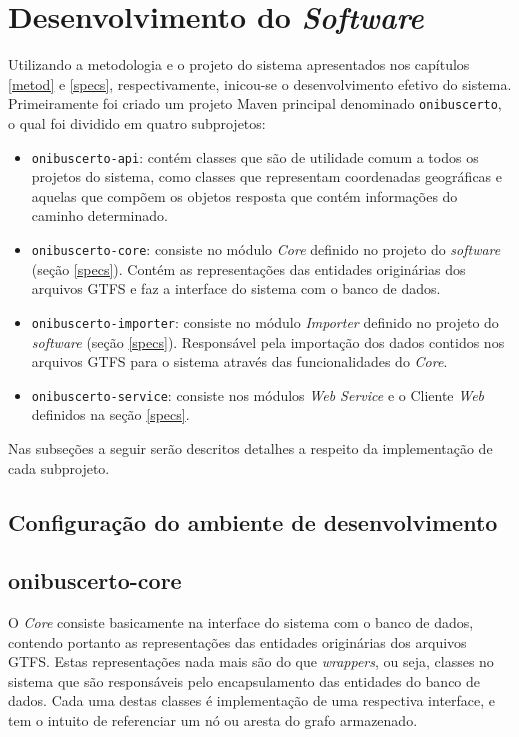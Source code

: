 \chapter{Desenvolvimento do \emph{Software}}
\label{chap:desenv}

Utilizando a metodologia e o projeto do sistema apresentados nos capítulos \ref{metod} e \ref{specs}, respectivamente, inicou-se o desenvolvimento efetivo do sistema.
Primeiramente foi criado um projeto Maven principal denominado \texttt{onibuscerto}, o qual foi dividido em quatro subprojetos: 
\begin{itemize}
	\item \texttt{onibuscerto-api}: contém classes que são de utilidade comum a todos os projetos do sistema, como classes que representam coordenadas geográficas e aquelas que compõem os objetos resposta que contém informações do caminho determinado.
	\item \texttt{onibuscerto-core}: consiste no módulo \emph{Core} definido no projeto do \emph{software} (seção \ref{specs}). 
	Contém as representações das entidades originárias dos arquivos GTFS e faz a interface do sistema com o banco de dados.
	\item \texttt{onibuscerto-importer}: consiste no módulo \emph{Importer} definido no projeto do \emph{software} (seção \ref{specs}).
	Responsável pela importação dos dados contidos nos arquivos GTFS para o sistema através das funcionalidades do \emph{Core}.
	\item \texttt{onibuscerto-service}: consiste nos módulos \emph{Web Service} e o Cliente \emph{Web} definidos na seção \ref{specs}.
\end{itemize}

Nas subseções a seguir serão descritos detalhes a respeito da implementação de cada subprojeto.

\section{Configuração do ambiente de desenvolvimento}

\section{onibuscerto-core}

O \emph{Core} consiste basicamente na interface do sistema com o banco de dados, contendo portanto as representações das entidades originárias dos arquivos GTFS.
Estas representações nada mais são do que \emph{wrappers}, ou seja, classes no sistema que são responsáveis pelo encapsulamento das entidades do banco de dados.
Cada uma destas classes é implementação de uma respectiva interface, e tem o intuito de referenciar um nó ou aresta do grafo armazenado.

